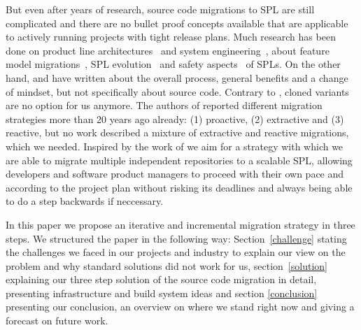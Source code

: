 But even after years of research, source code migrations to SPL are still
complicated and there are no bullet proof concepts available that are applicable
to actively running projects with tight release plans. Much research has been
done on product line architectures~\cite{Svahnberg1999EPLA,
confsplcTomashchukLJ21} and system engineering~\cite{confsplcSchaferBAKR21},
about feature model migrations~\cite{ncstrlustuttgartfiINPROC200185,
confsplcGrunerBKR20, confsplcDuszynskiDB19, confsplcFritschAR20}, SPL
evolution~\cite{journalssmrQuintonVRBGS21, Svahnberg1999ESPL, Eise02b,
kconfigKernel} and safety aspects~\cite{confsplcWolschke0SAM19} of SPLs. On the
other hand, \cite{confoopslaHetrickKM06} and \cite{confsplcAbbasJLESS20} have
written about the overall process, general benefits and a change of mindset, but
not specifically about source code. Contrary to \cite{confsplcRubinCC13}, cloned
variants are no option for us anymore. The authors of \cite{Krueger2001SMC}
reported different migration strategies more than 20 years ago already: (1)
proactive, (2) extractive and (3) reactive, but no work described a mixture of
extractive and reactive migrations, which we needed. Inspired by the work of
\cite{confsplcJepsenDB07} we aim for a strategy with which we are able to
migrate multiple independent repositories to a scalable SPL, allowing developers
and software product managers to proceed with their own pace and according to
the project plan without risking its deadlines and always being able to do a
step backwards if neccessary.

In this paper we propose an iterative and incremental migration strategy in
three steps. We structured the paper in the following way:
Section~\ref{challenge} stating the challenges we faced in our projects and
industry to explain our view on the problem and why standard solutions did not
work for us, section~\ref{solution} explaining our three step solution of the
source code migration in detail, presenting infrastructure and build system
ideas and section \ref{conclusion} presenting our conclusion, an overview on
where we stand right now and giving a forecast on future work.
